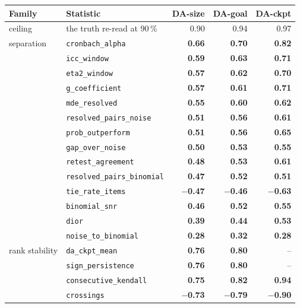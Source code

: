 \begin{table}[h]
\centering
\scriptsize
\begin{tabular}{@{}llrrr@{}}
\toprule
\textbf{Family} & \textbf{Statistic} & \textbf{DA-size} & \textbf{DA-goal} & \textbf{DA-ckpt} \\
\midrule
ceiling & the truth re-read at 90\,\% & 0.90 & 0.94 & 0.97 \\
\midrule
separation & \texttt{cronbach\_alpha} & \textbf{0.66} & \textbf{0.70} & \textbf{0.82} \\
 & \texttt{icc\_window} & \textbf{0.59} & \textbf{0.63} & \textbf{0.71} \\
 & \texttt{eta2\_window} & \textbf{0.57} & \textbf{0.62} & \textbf{0.70} \\
 & \texttt{g\_coefficient} & \textbf{0.57} & \textbf{0.61} & \textbf{0.71} \\
 & \texttt{mde\_resolved} & \textbf{0.55} & \textbf{0.60} & \textbf{0.62} \\
 & \texttt{resolved\_pairs\_noise} & \textbf{0.51} & \textbf{0.56} & \textbf{0.61} \\
 & \texttt{prob\_outperform} & \textbf{0.51} & \textbf{0.56} & \textbf{0.65} \\
 & \texttt{gap\_over\_noise} & \textbf{0.50} & \textbf{0.53} & \textbf{0.55} \\
 & \texttt{retest\_agreement} & \textbf{0.48} & \textbf{0.53} & \textbf{0.61} \\
 & \texttt{resolved\_pairs\_binomial} & \textbf{0.47} & \textbf{0.52} & \textbf{0.51} \\
 & \texttt{tie\_rate\_items} & \textbf{$-$0.47} & \textbf{$-$0.46} & \textbf{$-$0.63} \\
 & \texttt{binomial\_snr} & \textbf{0.46} & \textbf{0.52} & \textbf{0.55} \\
 & \texttt{dior} & \textbf{0.39} & \textbf{0.44} & \textbf{0.53} \\
 & \texttt{noise\_to\_binomial} & \textbf{0.28} & \textbf{0.32} & \textbf{0.28} \\
\midrule
rank stability & \texttt{da\_ckpt\_mean} & \textbf{0.76} & \textbf{0.80} & -- \\
 & \texttt{sign\_persistence} & \textbf{0.76} & \textbf{0.80} & -- \\
 & \texttt{consecutive\_kendall} & \textbf{0.75} & \textbf{0.82} & \textbf{0.94} \\
 & \texttt{crossings} & \textbf{$-$0.73} & \textbf{$-$0.79} & \textbf{$-$0.90} \\

\end{tabular}
\end{table}
